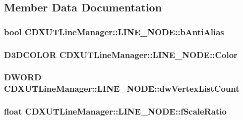 \subsection{Member Data Documentation}
\hypertarget{struct_c_d_x_u_t_line_manager_1_1_l_i_n_e___n_o_d_e_a5afd5e9697e25b5a2a27aaa5943ce683}{
\subsubsection[{bAntiAlias}]{\setlength{\rightskip}{0pt plus 5cm}bool {\bf CDXUTLineManager::LINE\_\-NODE::bAntiAlias}}}
\label{struct_c_d_x_u_t_line_manager_1_1_l_i_n_e___n_o_d_e_a5afd5e9697e25b5a2a27aaa5943ce683}
\hypertarget{struct_c_d_x_u_t_line_manager_1_1_l_i_n_e___n_o_d_e_ac5eb34ee677c6233a271904320ab5cc6}{
\subsubsection[{Color}]{\setlength{\rightskip}{0pt plus 5cm}D3DCOLOR {\bf CDXUTLineManager::LINE\_\-NODE::Color}}}
\label{struct_c_d_x_u_t_line_manager_1_1_l_i_n_e___n_o_d_e_ac5eb34ee677c6233a271904320ab5cc6}
\hypertarget{struct_c_d_x_u_t_line_manager_1_1_l_i_n_e___n_o_d_e_a1cca2772a871388faee3fd3e544babee}{
\subsubsection[{dwVertexListCount}]{\setlength{\rightskip}{0pt plus 5cm}DWORD {\bf CDXUTLineManager::LINE\_\-NODE::dwVertexListCount}}}
\label{struct_c_d_x_u_t_line_manager_1_1_l_i_n_e___n_o_d_e_a1cca2772a871388faee3fd3e544babee}
\hypertarget{struct_c_d_x_u_t_line_manager_1_1_l_i_n_e___n_o_d_e_a04167bd21ca4aa7480780e6ded9daa25}{
\subsubsection[{fScaleRatio}]{\setlength{\rightskip}{0pt plus 5cm}float {\bf CDXUTLineManager::LINE\_\-NODE::fScaleRatio}}}

